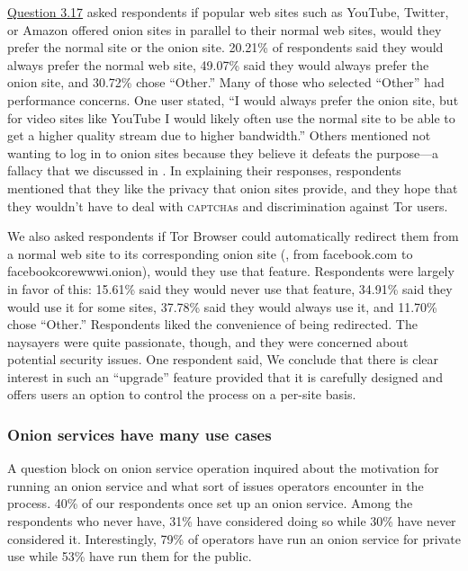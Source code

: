 \hyperref[q3_17]{Question 3.17} asked respondents if popular web sites such as
YouTube, Twitter, or Amazon offered onion sites in parallel to their normal web
sites, would they prefer the normal site or the onion site. 20.21\% of
respondents said they would always prefer the normal web site, 49.07\% said they
would always prefer the onion site, and 30.72\% chose ``Other.'' Many of those
who selected ``Other'' had performance concerns.  One user stated, ``I would
always prefer the onion site, but for video sites like YouTube I would likely
often use the normal site to be able to get a higher quality stream due to
higher bandwidth.'' Others mentioned not wanting to log in to onion sites
because they believe it defeats the purpose---a fallacy that we discussed in
.  In explaining their responses, respondents mentioned
that they like the privacy that onion sites provide, and they hope that they
wouldn't have to deal with \textsc{captcha}s and discrimination against Tor
users.

We also asked respondents if Tor Browser could automatically redirect them from
a normal web site to its corresponding onion site (\eg, from facebook.com to
facebookcorewwwi.onion), would they use that feature. Respondents were largely
in favor of this: 15.61\% said they would never use that feature, 34.91\% said
they would use it for some sites, 37.78\% said they would always use it, and
11.70\% chose ``Other.'' Respondents liked the convenience of being redirected.
The naysayers were quite passionate, though, and they were concerned about
potential security issues. One respondent said,
We conclude that there is clear interest in such an ``upgrade'' feature provided
that it is carefully designed and offers users an option to control the process
on a per-site basis.

\subsubsection{Onion services have many use cases}

A question block on onion service operation inquired about the motivation for
running an onion service and what sort of issues operators encounter in the
process.  40\% of our respondents once set up an onion service.  Among the
respondents who never have, 31\% have considered doing so while 30\% have never
considered it.  Interestingly, 79\% of operators have run an onion service for
private use while 53\% have run them for the public.

